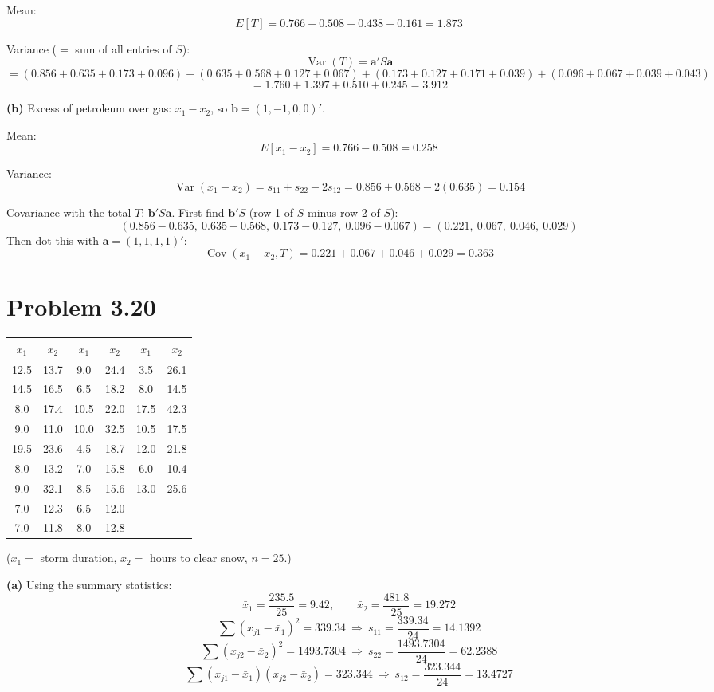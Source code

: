 \documentclass[11pt]{article}
\begin{document}
Mean:
\[
E[T]=0.766+0.508+0.438+0.161=\boxed{1.873}
\]

Variance ($=$ sum of all entries of $S$):
\[
\operatorname{Var}(T)=\mathbf a'S\mathbf a
\]
\[
=(0.856+0.635+0.173+0.096)+(0.635+0.568+0.127+0.067)+(0.173+0.127+0.171+0.039)+(0.096+0.067+0.039+0.043)
\]
\[
=1.760+1.397+0.510+0.245=\boxed{3.912}
\]

\textbf{(b)} Excess of petroleum over gas: $x_1-x_2$, so $\mathbf b=(1,-1,0,0)'$.

Mean:
\[
E[x_1-x_2]=0.766-0.508=\boxed{0.258}
\]

Variance:
\[
\operatorname{Var}(x_1-x_2)=s_{11}+s_{22}-2s_{12}=0.856+0.568-2(0.635)=\boxed{0.154}
\]

Covariance with the total $T$: $\mathbf b'S\mathbf a$. First find $\mathbf b'S$ (row 1 of
$S$ minus row 2 of $S$):
\[
(0.856-0.635,\ 0.635-0.568,\ 0.173-0.127,\ 0.096-0.067)=(0.221,\ 0.067,\ 0.046,\ 0.029)
\]
Then dot this with $\mathbf a=(1,1,1,1)'$:
\[
\operatorname{Cov}(x_1-x_2,T)=0.221+0.067+0.046+0.029=\boxed{0.363}
\]

\newpage
\section*{Problem 3.20}

\begin{center}
\begin{tabular}{cc|cc|cc}
$x_1$ & $x_2$ & $x_1$ & $x_2$ & $x_1$ & $x_2$\\ \hline
12.5 & 13.7 & 9.0 & 24.4 & 3.5 & 26.1\\
14.5 & 16.5 & 6.5 & 18.2 & 8.0 & 14.5\\
8.0 & 17.4 & 10.5 & 22.0 & 17.5 & 42.3\\
9.0 & 11.0 & 10.0 & 32.5 & 10.5 & 17.5\\
19.5 & 23.6 & 4.5 & 18.7 & 12.0 & 21.8\\
8.0 & 13.2 & 7.0 & 15.8 & 6.0 & 10.4\\
9.0 & 32.1 & 8.5 & 15.6 & 13.0 & 25.6\\
7.0 & 12.3 & 6.5 & 12.0 & & \\
7.0 & 11.8 & 8.0 & 12.8 & &
\end{tabular}
\end{center}
($x_1=$ storm duration, $x_2=$ hours to clear snow, $n=25$.)

\textbf{(a)} Using the summary statistics:
\[
\bar x_1=\frac{235.5}{25}=9.42,\qquad \bar x_2=\frac{481.8}{25}=19.272
\]
\[
\sum(x_{j1}-\bar x_1)^2=339.34\ \Rightarrow\ s_{11}=\frac{339.34}{24}=14.1392
\]
\[
\sum(x_{j2}-\bar x_2)^2=1493.7304\ \Rightarrow\ s_{22}=\frac{1493.7304}{24}=62.2388
\]
\[
\sum(x_{j1}-\bar x_1)(x_{j2}-\bar x_2)=323.344\ \Rightarrow\ s_{12}=\frac{323.344}{24}=13.4727
\]
\end{document}
